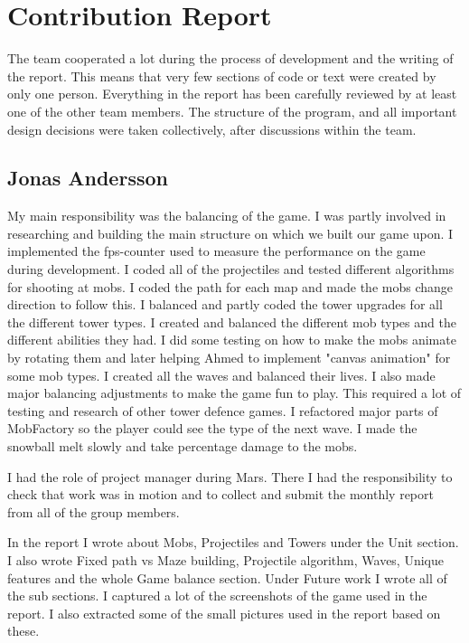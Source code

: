 
\chapter{Contribution Report}

The team cooperated a lot during the process of development and the writing of the report. This means that very few sections of code or text were created by only one person. Everything in the report has been carefully reviewed by at least one of the other team members. The structure of the program, and all important design decisions were taken collectively, after discussions within the team.


\section{Jonas Andersson}

My main responsibility was the balancing of the game. I was partly involved in researching and building the main structure on which we built our game upon. I implemented the fps-counter used to measure the performance on the game during development. I coded all of the projectiles and tested different algorithms for shooting at mobs. I coded the path for each map and made the mobs change direction to follow this. I balanced and partly coded the tower upgrades for all the different tower types. I created and balanced the different mob types and the different abilities they had. I did some testing on how to make the mobs animate by rotating them and later helping Ahmed to implement "canvas animation" for some mob types. I created all the waves and balanced their lives. I also made major balancing adjustments to make the game fun to play. This required a lot of testing and research of other tower defence games. I refactored major parts of MobFactory so the player could see the type of the next wave. I made the snowball melt slowly and take percentage damage to the mobs.

I had the role of project manager during Mars. There I had the responsibility to check that work was in motion and to collect and submit the monthly report from all of the group members.

In the report I wrote about Mobs, Projectiles and Towers under the Unit section. I also wrote Fixed path vs Maze building, Projectile algorithm, Waves, Unique features and the whole Game balance section. Under Future work I wrote all of the sub sections. I captured a lot of the screenshots of the game used in the report. I also extracted some of the small pictures used in the report based on these.

